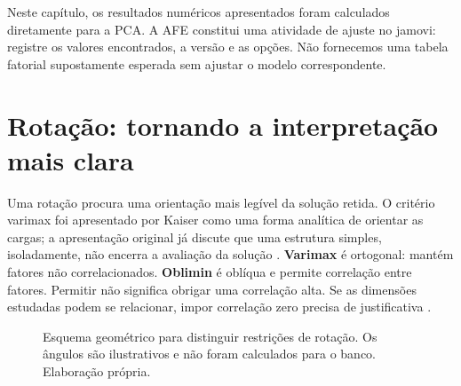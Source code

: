 Neste capítulo, os resultados numéricos apresentados foram calculados diretamente para a PCA. A AFE constitui uma atividade de ajuste no jamovi: registre os valores encontrados, a versão e as opções. Não fornecemos uma tabela fatorial supostamente esperada sem ajustar o modelo correspondente.

\section{Rotação: tornando a interpretação mais clara}

Uma rotação procura uma orientação mais legível da solução retida. O critério varimax foi apresentado por Kaiser como uma forma analítica de orientar as cargas; a apresentação original já discute que uma estrutura simples, isoladamente, não encerra a avaliação da solução \parencite{Kaiser1958}. \textbf{Varimax} é ortogonal: mantém fatores não correlacionados. \textbf{Oblimin} é oblíqua e permite correlação entre fatores. Permitir não significa obrigar uma correlação alta. Se as dimensões estudadas podem se relacionar, impor correlação zero precisa de justificativa \parencite{RevelleFatores}.

\begin{figure}[H]
\centering
{}
\caption{Esquema geométrico para distinguir restrições de rotação. Os ângulos são ilustrativos e não foram calculados para o banco. Elaboração própria.}
\label{fig:rotacao-dimensoes}
\end{figure}

